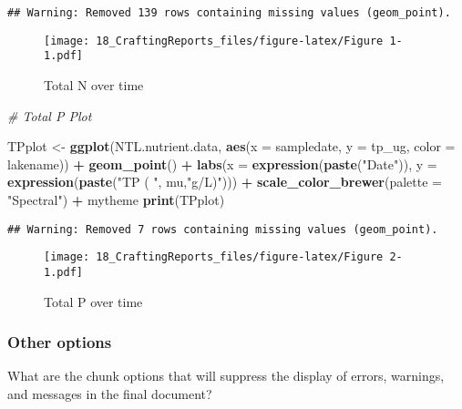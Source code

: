 \documentclass[]{article}
\newenvironment{Shaded}{\begin{snugshade}}{\end{snugshade}}
\newcommand{\KeywordTok}[1]{\textcolor[rgb]{0.13,0.29,0.53}{\textbf{#1}}}
\newcommand{\DataTypeTok}[1]{\textcolor[rgb]{0.13,0.29,0.53}{#1}}
\newcommand{\StringTok}[1]{\textcolor[rgb]{0.31,0.60,0.02}{#1}}
\newcommand{\CommentTok}[1]{\textcolor[rgb]{0.56,0.35,0.01}{\textit{#1}}}
\newcommand{\OperatorTok}[1]{\textcolor[rgb]{0.81,0.36,0.00}{\textbf{#1}}}
\newcommand{\NormalTok}[1]{#1}
\begin{document}
\begin{verbatim}
## Warning: Removed 139 rows containing missing values (geom_point).
\end{verbatim}

\begin{figure}
\centering
\texttt{[image: 18\_CraftingReports\_files/figure-latex/Figure 1-1.pdf]}
\caption{Total N over time}
\end{figure}

\begin{Shaded}
\begin{Highlighting}[]
\CommentTok{# Total P Plot}

\NormalTok{TPplot <-}\StringTok{ }
\StringTok{  }\KeywordTok{ggplot}\NormalTok{(NTL.nutrient.data, }\KeywordTok{aes}\NormalTok{(}\DataTypeTok{x =}\NormalTok{ sampledate, }\DataTypeTok{y =}\NormalTok{ tp_ug, }
                     \DataTypeTok{color =}\NormalTok{ lakename)) }\OperatorTok{+}
\StringTok{  }\KeywordTok{geom_point}\NormalTok{() }\OperatorTok{+}
\StringTok{  }\KeywordTok{labs}\NormalTok{(}\DataTypeTok{x =} \KeywordTok{expression}\NormalTok{(}\KeywordTok{paste}\NormalTok{(}\StringTok{"Date"}\NormalTok{)),}
    \DataTypeTok{y =} \KeywordTok{expression}\NormalTok{(}\KeywordTok{paste}\NormalTok{(}\StringTok{"TP ( "}\NormalTok{, mu,}\StringTok{"g/L)"}\NormalTok{))) }\OperatorTok{+}
\StringTok{  }\KeywordTok{scale_color_brewer}\NormalTok{(}\DataTypeTok{palette =} \StringTok{"Spectral"}\NormalTok{) }\OperatorTok{+}
\StringTok{  }\NormalTok{mytheme}
\KeywordTok{print}\NormalTok{(TPplot)}
\end{Highlighting}
\end{Shaded}

\begin{verbatim}
## Warning: Removed 7 rows containing missing values (geom_point).
\end{verbatim}

\begin{figure}
\centering
\texttt{[image: 18\_CraftingReports\_files/figure-latex/Figure 2-1.pdf]}
\caption{Total P over time}
\end{figure}

\subsubsection{Other options}\label{other-options}

What are the chunk options that will suppress the display of errors,
warnings, and messages in the final document?
\end{document}

